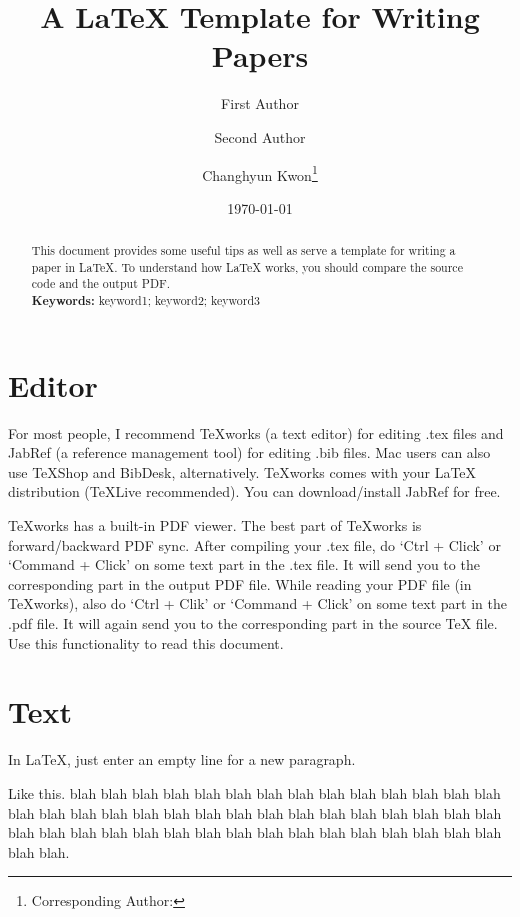 \documentclass[letterpaper, 11pt]{article}
\title{A LaTeX Template for Writing Papers}
\author[1]{First Author}
\author[2]{Second Author}
\author[3]{Changhyun Kwon\footnote{Corresponding Author: \email{chkwon@usf.edu}}}
\affil[1]{Department of First Engineering, First University}
\affil[2]{Department of Second Engineering, First University}
\affil[3]{Department of Industrial and Management Systems Engineering, University of South Florida}
\date{\today}
\newcommand{\rednote}[1]{{\Large\color{red}#1}}
\begin{document}
\maketitle

\begin{abstract}
This document provides some useful tips as well as serve a template for writing a paper in LaTeX. To understand how LaTeX works, you should compare the source code and the output PDF.\\
\noindent\textbf{Keywords:} keyword1; keyword2; keyword3
\end{abstract}




\section{Editor} \label{sec:editor}

For most people, I recommend TeXworks (a text editor) for editing .tex files and JabRef (a reference management tool) for editing .bib files. Mac users can also use TeXShop and BibDesk, alternatively. TeXworks comes with your LaTeX distribution (TeXLive recommended). You can download/install JabRef for free.

TeXworks has a built-in PDF viewer. The best part of TeXworks is forward/backward PDF sync. After compiling your .tex file, do `Ctrl + Click' or `Command + Click' on some text part in the .tex file. It will send you to the corresponding part in the output PDF file. While reading your PDF file (in TeXworks), also do `Ctrl + Clik' or `Command + Click' on some text part in the .pdf file. It will again send you to the corresponding part in the source TeX file. Use this functionality to read this document. 











\section{Text} \label{sec:paragraph}
In LaTeX, just enter an empty line for a new paragraph.

Like this. blah blah blah blah blah blah blah blah blah blah blah blah blah blah blah blah blah blah blah blah blah blah blah blah blah blah blah blah blah blah blah blah blah blah blah blah blah blah blah blah blah blah blah blah blah blah blah blah.
\end{document}
